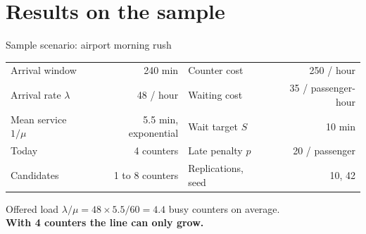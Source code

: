 \documentclass[aspectratio=169,11pt]{beamer}
\begin{document}
\section{Results on the sample}
\begin{frame}{Sample scenario: airport morning rush}
  \centering
  \begin{tabular}{@{}lr@{\qquad\qquad}lr@{}}
    \toprule
    Arrival window & 240 min & Counter cost & 250 / hour \\
    Arrival rate $\lambda$ & 48 / hour & Waiting cost & 35 / passenger-hour \\
    Mean service $1/\mu$ & 5.5 min, exponential & Wait target $S$ & 10 min \\
    Today & 4 counters & Late penalty $p$ & 20 / passenger \\
    Candidates & 1 to 8 counters & Replications, seed & 10, 42 \\
    \bottomrule
  \end{tabular}
  \vskip16pt
  Offered load $\lambda/\mu = 48 \times 5.5 / 60 = \mathbf{4.4}$ busy counters on average.\\[3pt]
  {\color{today}\bfseries With 4 counters the line can only grow.}
\end{frame}
\end{document}
